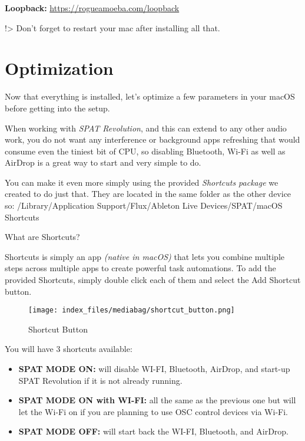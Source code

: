 \documentclass[
  letterpaper,
  DIV=11,
  numbers=noendperiod]{scrreport}
\begin{document}
\textbf{Loopback:} \url{https://rogueamoeba.com/loopback}

!\textgreater{} Don't forget to restart your mac after installing all
that.

\hypertarget{optimization-1}{%
\section{Optimization}\label{optimization-1}}

Now that everything is installed, let's optimize a few parameters in
your macOS before getting into the setup.

When working with \emph{SPAT Revolution}, and this can extend to any
other audio work, you do not want any interference or background apps
refreshing that would consume even the tiniest bit of CPU, so disabling
Bluetooth, Wi-Fi as well as AirDrop is a great way to start and very
simple to do.

You can make it even more simply using the provided \emph{Shortcuts
package} we created to do just that. They are located in the same folder
as the other device so: /Library/Application Support/Flux/Ableton Live
Devices/SPAT/macOS Shortcuts

What are Shortcuts?

Shortcuts is simply an app \emph{(native in macOS)} that lets you
combine multiple steps across multiple apps to create powerful task
automations. To add the provided Shortcuts, simply double click each of
them and select the Add Shortcut button.

\begin{figure}

{\centering \texttt{[image: index\_files/mediabag/shortcut\_button.png]}

}

\caption{Shortcut Button}

\end{figure}

You will have 3 shortcuts available:

\begin{itemize}
\item
  \textbf{SPAT MODE ON:} will disable WI-FI, Bluetooth, AirDrop, and
  start-up SPAT Revolution if it is not already running.
\item
  \textbf{SPAT MODE ON with WI-FI:} all the same as the previous one but
  will let the Wi-Fi on if you are planning to use OSC control devices
  via Wi-Fi.
\item
  \textbf{SPAT MODE OFF:} will start back the WI-FI, Bluetooth, and
  AirDrop.
\end{itemize}
\end{document}
